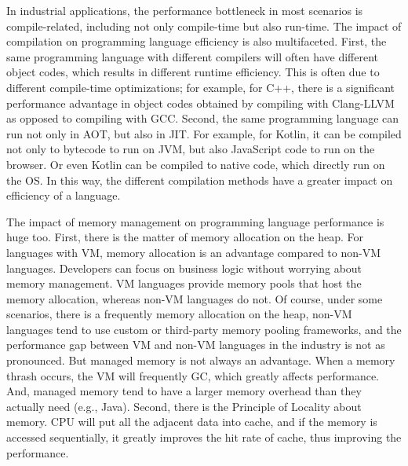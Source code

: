 In industrial applications, the performance bottleneck in most scenarios is compile-related,
including not only compile-time but also run-time.
The impact of compilation on programming language efficiency is also multifaceted.
First, the same programming language with different compilers will often have different object codes,
which results in different runtime efficiency.
This is often due to different compile-time optimizations;
for example, for C++, there is a significant performance advantage in object codes obtained by compiling
with Clang-LLVM as opposed to compiling with GCC\@.
Second, the same programming language can run not only in AOT, but also in JIT\@.
For example, for Kotlin, it can be compiled not only to bytecode to run on JVM, but also JavaScript code to run on the browser.
Or even Kotlin can be compiled to native code, which directly run on the OS\@.
In this way, the different compilation methods have a greater impact on efficiency of a language.

The impact of memory management on programming language performance is huge too.
First, there is the matter of memory allocation on the heap.
For languages with VM, memory allocation is an advantage compared to non-VM languages.
Developers can focus on business logic without worrying about memory management.
VM languages provide memory pools that host the memory allocation, whereas non-VM languages do not.
Of course, under some scenarios, there is a frequently memory allocation on the heap,
non-VM languages tend to use custom or third-party memory pooling frameworks,
and the performance gap between VM and non-VM languages in the industry is not as pronounced.
But managed memory is not always an advantage.
When a memory thrash occurs, the VM will frequently GC, which greatly affects performance.
And, managed memory tend to have a larger memory overhead than they actually need (e.g., Java).
Second, there is the Principle of Locality about memory.
CPU will put all the adjacent data into cache, and if the memory is accessed sequentially,
it greatly improves the hit rate of cache, thus improving the performance.
